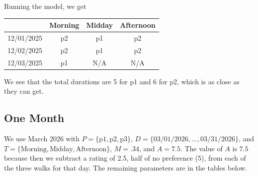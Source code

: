 \documentclass{notes}
\begin{document}
Running the model, we get
\begin{center}
	\begin{tabular}{c|ccc}
		& Morning & Midday & Afternoon\\
		\hline
		12/01/2025 & p2 & p1 & p2\\
		12/02/2025 & p2 & p1 & p2\\
		12/03/2025 & p1 & N/A & N/A
	\end{tabular}
\end{center}
We see that the total durations are 5 for p1 and 6 for p2, which is as close as they can get.

\subsection*{One Month}
We use March 2026 with $P=\{\text{p1},\text{p2}, \text{p3}\}$, $D=\{\text{03/01/2026},\dots,\text{03/31/2026}\}$, and $T=\{\text{Morning},\text{Midday},\text{Afternoon}\}$, $M=.34$, and $A=7.5$. The value of $A$ is $7.5$ because then we subtract a rating of 2.5, half of no preference (5), from each of the three walks for that day. The remaining parameters are in the tables below.\\
\end{document}
